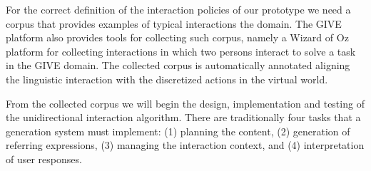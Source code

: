 For the correct definition of the interaction policies of our prototype we need
a corpus that provides examples of typical interactions the domain. The GIVE
platform also provides tools for collecting such corpus, namely a Wizard of Oz
platform for collecting interactions in which two persons interact to solve a
task in the GIVE domain. The collected corpus is automatically annotated
aligning the linguistic interaction with the discretized actions in the virtual
world. 


From the collected corpus we will begin the design, implementation and testing
of the unidirectional interaction algorithm. There are traditionally four tasks
that a generation system must implement: (1) planning the content, (2)
generation of referring expressions, (3) managing the interaction context, and
(4) interpretation of user responses. 


